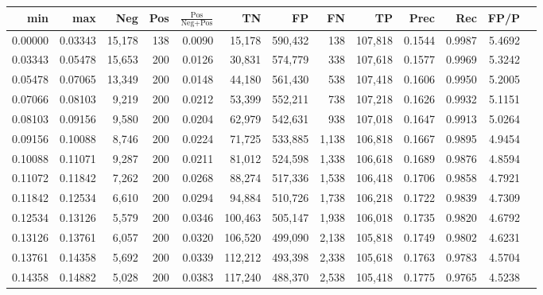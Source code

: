 \begin{tabular}{rrrrrrrrrrrrr}
\toprule
    min &     max &    Neg & Pos & $\frac{\text{Pos}}{\text{Neg}+\text{Pos}}$ &      TN &      FP &      FN &      TP &   Prec &    Rec &   FP/P \\
\midrule
0.00000 & 0.03343 & 15,178 & 138 &                                     0.0090 &  15,178 & 590,432 &     138 & 107,818 & 0.1544 & 0.9987 & 5.4692 \\
0.03343 & 0.05478 & 15,653 & 200 &                                     0.0126 &  30,831 & 574,779 &     338 & 107,618 & 0.1577 & 0.9969 & 5.3242 \\
0.05478 & 0.07065 & 13,349 & 200 &                                     0.0148 &  44,180 & 561,430 &     538 & 107,418 & 0.1606 & 0.9950 & 5.2005 \\
0.07066 & 0.08103 &  9,219 & 200 &                                     0.0212 &  53,399 & 552,211 &     738 & 107,218 & 0.1626 & 0.9932 & 5.1151 \\
0.08103 & 0.09156 &  9,580 & 200 &                                     0.0204 &  62,979 & 542,631 &     938 & 107,018 & 0.1647 & 0.9913 & 5.0264 \\
0.09156 & 0.10088 &  8,746 & 200 &                                     0.0224 &  71,725 & 533,885 &   1,138 & 106,818 & 0.1667 & 0.9895 & 4.9454 \\
0.10088 & 0.11071 &  9,287 & 200 &                                     0.0211 &  81,012 & 524,598 &   1,338 & 106,618 & 0.1689 & 0.9876 & 4.8594 \\
0.11072 & 0.11842 &  7,262 & 200 &                                     0.0268 &  88,274 & 517,336 &   1,538 & 106,418 & 0.1706 & 0.9858 & 4.7921 \\
0.11842 & 0.12534 &  6,610 & 200 &                                     0.0294 &  94,884 & 510,726 &   1,738 & 106,218 & 0.1722 & 0.9839 & 4.7309 \\
0.12534 & 0.13126 &  5,579 & 200 &                                     0.0346 & 100,463 & 505,147 &   1,938 & 106,018 & 0.1735 & 0.9820 & 4.6792 \\
0.13126 & 0.13761 &  6,057 & 200 &                                     0.0320 & 106,520 & 499,090 &   2,138 & 105,818 & 0.1749 & 0.9802 & 4.6231 \\
0.13761 & 0.14358 &  5,692 & 200 &                                     0.0339 & 112,212 & 493,398 &   2,338 & 105,618 & 0.1763 & 0.9783 & 4.5704 \\
0.14358 & 0.14882 &  5,028 & 200 &                                     0.0383 & 117,240 & 488,370 &   2,538 & 105,418 & 0.1775 & 0.9765 & 4.5238 \\

\end{tabular}
